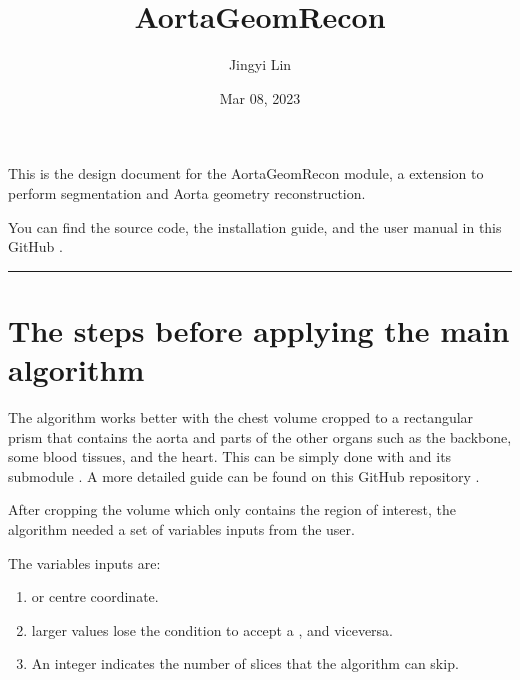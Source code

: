 \documentclass[letterpaper,10pt,english]{sphinxmanual}
\title{AortaGeomRecon}
\date{Mar 08, 2023}
\author{Jingyi Lin}
\begin{document}
\pagestyle{empty}
\sphinxmaketitle
\pagestyle{plain}
\sphinxtableofcontents
\pagestyle{normal}
\label{\detokenize{index::doc}}


\sphinxAtStartPar
This is the design document for the AortaGeomRecon module, a {\hyperref[\detokenize{glossary:term-3D-Slicer}]{}} extension to perform {\hyperref[\detokenize{glossary:term-Aorta}]{}} segmentation and Aorta geometry reconstruction.

\sphinxAtStartPar
You can find the source code, the installation guide, and the user manual in this GitHub .


\bigskip\hrule\bigskip



\chapter{The steps before applying the main algorithm}
\label{\detokenize{index:the-steps-before-applying-the-main-algorithm}}
\sphinxAtStartPar
The algorithm works better with the chest volume cropped to a rectangular prism that contains the aorta and parts of the other organs such as the backbone, some blood tissues, and the heart. This can be simply done with {\hyperref[\detokenize{glossary:term-3D-Slicer}]{}} and its submodule . A more detailed guide can be found on this GitHub repository .

\sphinxAtStartPar
After cropping the volume which only contains the region of interest, the algorithm needed a set of variables inputs from the user.

\sphinxAtStartPar
The variables inputs are:
\begin{enumerate}
%
\item {} 
\sphinxAtStartPar
{\hyperref[\detokenize{glossary:term-Descending-Aorta}]{}} or {\hyperref[\detokenize{glossary:term-Ascending-Aorta}]{}} centre coordinate.

\item {} 
\sphinxAtStartPar
{\hyperref[\detokenize{glossary:term-Qualified-coefficient}]{}} larger values lose the condition to accept a {\hyperref[\detokenize{glossary:term-segmented}]{}} {\hyperref[\detokenize{glossary:term-slice}]{}}, and vice\sphinxhyphen{}versa.

\item {} 
\sphinxAtStartPar
An integer indicates the number of slices that the algorithm can skip.

\end{enumerate}
\end{document}
